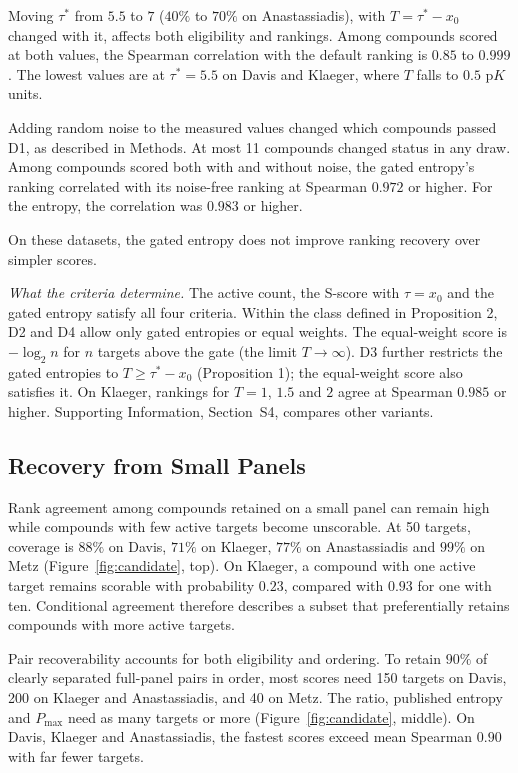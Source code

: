 Moving $\tau^*$ from $5.5$ to $7$ ($40\%$ to $70\%$ on Anastassiadis), with
$T = \tau^* - x_0$ changed with it, affects both eligibility and rankings.
Among compounds scored at both values, the Spearman correlation with the
default ranking is $0.85$ to $0.999$. The lowest values
are at $\tau^* = 5.5$ on Davis and Klaeger, where $T$ falls to $0.5$
$\mathrm{p}K$ units.

Adding random noise to the measured values changed which compounds passed
D1, as described in Methods. At most 11 compounds changed status in any draw.
Among compounds scored both with and without noise, the gated entropy's
ranking correlated with its noise-free ranking at Spearman $0.972$ or higher.
For the entropy, the correlation was $0.983$ or higher.

On these datasets, the gated entropy does not improve ranking recovery over
simpler scores.

\emph{What the criteria determine.} The active count, the S-score with
$\tau = x_0$ and the gated entropy satisfy all four criteria. Within the
class defined in Proposition 2, D2 and D4 allow only gated entropies or equal
weights. The equal-weight score is $-\log_2 n$ for $n$ targets above the gate (the limit
$T \to \infty$). D3 further restricts the gated entropies to
$T \geq \tau^* - x_0$ (Proposition 1); the equal-weight score also satisfies
it. On Klaeger, rankings for $T = 1$, $1.5$
and $2$ agree at Spearman $0.985$ or higher. Supporting Information,
Section~S4, compares other variants.

\subsection{Recovery from Small Panels}
\label{sec:recovery}

Rank agreement among compounds retained on a small panel can remain high
while compounds with few active targets become unscorable. At 50 targets,
coverage is $88\%$ on Davis, $71\%$ on Klaeger, $77\%$ on Anastassiadis and
$99\%$ on Metz (Figure~\ref{fig:candidate}, top). On Klaeger, a compound with
one active target remains scorable with probability $0.23$, compared with
$0.93$ for one with ten. Conditional agreement therefore describes a subset
that preferentially retains compounds with more active targets.

Pair recoverability accounts for both eligibility and ordering. To retain
$90\%$ of clearly separated full-panel pairs in order, most scores need
150 targets on Davis, 200 on Klaeger and Anastassiadis, and 40 on Metz.
The ratio, published entropy and $P_{\max}$ need as many targets or more
(Figure~\ref{fig:candidate}, middle). On Davis, Klaeger and Anastassiadis,
the fastest scores exceed mean Spearman $0.90$ with far fewer targets.


